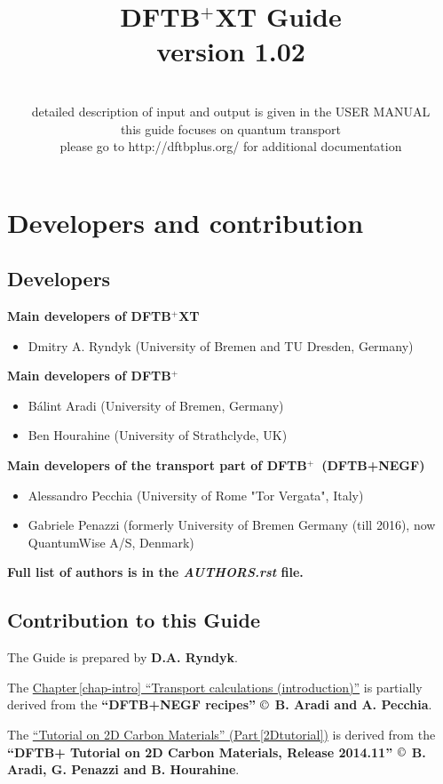 \documentclass[a4paper,11pt,english]{sphinxmanual}
\title{DFTB$^{\text{+}}$XT Guide \\ version 1.02}
\author{}
\date{\normalfont\sffamily {http://quantranspro.org/dftb+xt/}\\[0.2cm]
  detailed description of input and output is given in the \dftbpxt USER MANUAL \\[0.2cm]
  this guide focuses on quantum transport \\
  please go to {http://dftbplus.org/} for additional \dftbp documentation}
\newcommand{\dftbp}{\textsf{DFTB$^{\text{+}}$\ }} %
\newcommand{\dftbpxt}{\textsf{DFTB$^{\text{+}}$XT\ }} %
\begin{document}
\maketitle

\chapter*{\Large\bf\sffamily Developers and contribution}

\section*{Developers}

{\bf Main developers of \dftbpxt}
\begin{itemize}
\item Dmitry A. Ryndyk (University of Bremen and TU Dresden, Germany)
\end{itemize}
  
{\bf Main developers of \dftbp}
\begin{itemize}
\item Bálint Aradi (University of Bremen, Germany)
\item Ben Hourahine (University of Strathclyde, UK)
\end{itemize}
  
{\bf Main developers of the transport part of \dftbp (DFTB+NEGF)}
\begin{itemize}
\item Alessandro Pecchia (University of Rome "Tor Vergata", Italy)
\item Gabriele Penazzi (formerly University of Bremen Germany (till 2016), now QuantumWise A/S, Denmark)
\end{itemize}

{\bf Full list of authors is in the \emph{AUTHORS.rst} file.}

\section*{Contribution to this Guide}

The Guide is prepared by {\bf D.A. Ryndyk}.

The {\hyperref[chap-intro]{Chapter\,\ref{chap-intro} ``Transport calculations (introduction)''}} is partially derived from the {\bf ``DFTB+NEGF recipes'' $\copyright$ B. Aradi and A. Pecchia}.   

The {\hyperref[2Dtutorial]{``Tutorial on 2D Carbon Materials'' (Part\,\ref{2Dtutorial})}} is derived from the {\bf ``DFTB+ Tutorial on 2D Carbon Materials, Release 2014.11'' $\copyright$ B. Aradi, G. Penazzi and B. Hourahine}.    
    
\end{document}
